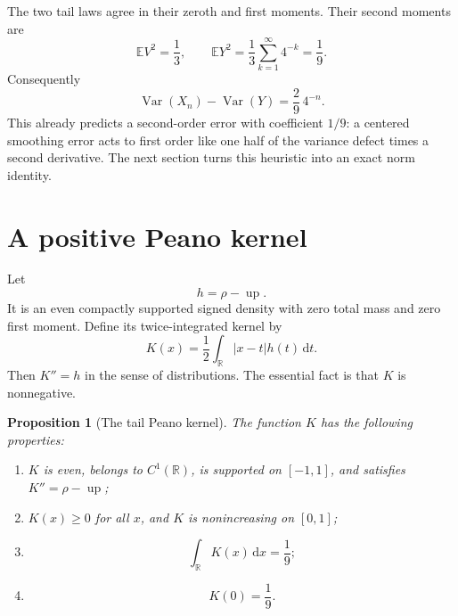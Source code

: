\documentclass[11pt,oneside]{article}
\newtheorem{proposition}[theorem]{Proposition}
\theoremstyle{definition}
\theoremstyle{remark}
\newcommand{\R}{\mathbb R}
\newcommand{\Up}{\operatorname{up}}
\newcommand{\dd}{\,\mathrm d}
\newcommand{\Var}{\operatorname{Var}}
\newcommand{\E}{\mathbb E}
\begin{document}
The two tail laws agree in their zeroth and first moments.  Their second moments are
\begin{equation}
 \E V^2=\frac13,
 \qquad
 \E Y^2=\frac13\sum_{k=1}^{\infty}4^{-k}=\frac19.          \label{repeated:eq:tail-variances}
\end{equation}
Consequently
\begin{equation}
 \Var(X_n)-\Var(Y)=\frac29\,4^{-n}.                        \label{repeated:eq:variance-defect}
\end{equation}
This already predicts a second-order error with coefficient $1/9$: a centered smoothing
error acts to first order like one half of the variance defect times a second derivative.
The next section turns this heuristic into an exact norm identity.

\section{A positive Peano kernel}
\label{repeated:sec:Peano}

Let
\begin{equation}
 h=\rho-\Up.                                                \label{repeated:eq:h}
\end{equation}
It is an even compactly supported signed density with zero total mass and zero first moment.
Define its twice-integrated kernel by
\begin{equation}
 K(x)=\frac12\int_{\R}|x-t|h(t)\dd t.                      \label{repeated:eq:K-def}
\end{equation}
Then $K''=h$ in the sense of distributions.  The essential fact is that $K$ is nonnegative.

\begin{proposition}[The tail Peano kernel]
\label{repeated:prop:K-properties}
The function $K$ has the following properties:
\begin{enumerate}
\item $K$ is even, belongs to $C^1(\R)$, is supported on $[-1,1]$, and satisfies $K''=\rho-\Up$;
\item $K(x)\ge0$ for all $x$, and $K$ is nonincreasing on $[0,1]$;
\item
\begin{equation}
 \int_{\R}K(x)\dd x=\frac19;                              \label{repeated:eq:K-mass}
\end{equation}
\item
\begin{equation}
 K(0)=\frac19.                                             \label{repeated:eq:K-zero}
\end{equation}
\end{enumerate}
\end{proposition}
\end{document}
